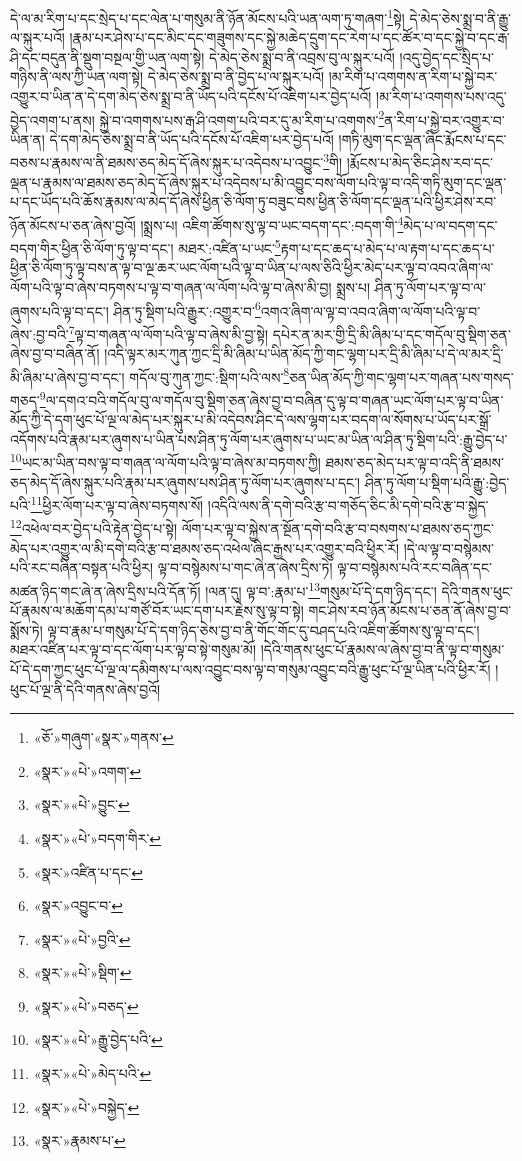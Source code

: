 དེ་ལ་མ་རིག་པ་དང་སྲེད་པ་དང་ལེན་པ་གསུམ་ནི་ཉོན་མོངས་པའི་ཡན་ལག་ཏུ་གཞག་\footnote{«ཅོ་»གཞུག་«སྣར་»གནས་}སྟེ། དེ་མེད་ཅེས་སྨྲ་བ་ནི་རྒྱུ་ལ་སྐུར་པའོ། །རྣམ་པར་ཤེས་པ་དང་མིང་དང་གཟུགས་དང་སྐྱེ་མཆེད་དྲུག་དང་རེག་པ་དང་ཚོར་བ་དང་སྐྱེ་བ་དང་རྒ་ཤི་དང་བདུན་ནི་སྡུག་བསྔལ་གྱི་ཡན་ལག་སྟེ། དེ་མེད་ཅེས་སྨྲ་བ་ནི་འབྲས་བུ་ལ་སྐུར་པའོ། །འདུ་བྱེད་དང་སྲིད་པ་གཉིས་ནི་ལས་ཀྱི་ཡན་ལག་སྟེ། དེ་མེད་ཅེས་སྨྲ་བ་ནི་བྱེད་པ་ལ་སྐུར་པའོ། །མ་རིག་པ་འགགས་ན་རིག་པ་སྐྱེ་བར་འགྱུར་བ་ཡིན་ན་དེ་དག་མེད་ཅེས་སྨྲ་བ་ནི་ཡོད་པའི་དངོས་པོ་འཇིག་པར་བྱེད་པའོ། །མ་རིག་པ་འགགས་པས་འདུ་བྱེད་འགག་པ་ནས། སྐྱེ་བ་འགགས་པས་རྒ་ཤི་འགག་པའི་བར་དུ་མ་རིག་པ་འགགས་\footnote{«སྣར་»«པེ་»འགག་}ན་རིག་པ་སྐྱེ་བར་འགྱུར་བ་ཡིན་ན། དེ་དག་མེད་ཅེས་སྨྲ་བ་ནི་ཡོད་པའི་དངོས་པོ་འཇིག་པར་བྱེད་པའོ། །གཏི་མུག་དང་ལྡན་ཞིང་རྨོངས་པ་དང་བཅས་པ་རྣམས་ལ་ནི་ཐམས་ཅད་མེད་དོ་ཞེས་སྐུར་པ་འདེབས་པ་འབྱུང་\footnote{«སྣར་»«པེ་»བྱུང་}གི། །རྨོངས་པ་མེད་ཅིང་ཤེས་རབ་དང་ལྡན་པ་རྣམས་ལ་ཐམས་ཅད་མེད་དོ་ཞེས་སྐུར་པ་འདེབས་པ་མི་འབྱུང་བས་ལོག་པའི་ལྟ་བ་འདི་གཏི་མུག་དང་ལྡན་པ་དང་ཡོད་པའི་ཆོས་རྣམས་ལ་མེད་དོ་ཞེས་ཕྱིན་ཅི་ལོག་ཏུ་བཟུང་བས་ཕྱིན་ཅི་ལོག་དང་ལྡན་པའི་ཕྱིར་ཤེས་རབ་ཉོན་མོངས་པ་ཅན་ཞེས་བྱའོ། །སྨྲས་པ། འཇིག་ཚོགས་སུ་ལྟ་བ་ཡང་བདག་དང་:བདག་གི་\footnote{«སྣར་»«པེ་»བདག་གིར་}མེད་པ་ལ་བདག་དང་བདག་གིར་ཕྱིན་ཅི་ལོག་ཏུ་ལྟ་བ་དང་། མཐར་:འཛིན་པ་ཡང་\footnote{«སྣར་»འཛིན་པ་དང་}རྟག་པ་དང་ཆད་པ་མེད་པ་ལ་རྟག་པ་དང་ཆད་པ་ཕྱིན་ཅི་ལོག་ཏུ་ལྟ་བས་ན་ལྟ་བ་ལྔ་ཆར་ཡང་ལོག་པའི་ལྟ་བ་ཡིན་པ་ལས་ཅིའི་ཕྱིར་མེད་པར་ལྟ་བ་འབའ་ཞིག་ལ་ལོག་པའི་ལྟ་བ་ཞེས་བཏགས་པ་ལྟ་བ་གཞན་ལ་ལོག་པའི་ལྟ་བ་ཞེས་མི་བྱ། སྨྲས་པ། ཤིན་ཏུ་ལོག་པར་ལྟ་བ་ལ་ཞུགས་པའི་ལྟ་བ་དང་། ཤིན་ཏུ་སྡིག་པའི་རྒྱུར་:འགྱུར་བ་\footnote{«སྣར་»འབྱུང་བ་}འགའ་ཞིག་ལ་ལྟ་བ་འབའ་ཞིག་ལ་ལོག་པའི་ལྟ་བ་ཞེས་:བྱ་བའི་\footnote{«སྣར་»«པེ་»བྱའི་}ལྟ་བ་གཞན་ལ་ལོག་པའི་ལྟ་བ་ཞེས་མི་བྱ་སྟེ། དཔེར་ན་མར་གྱི་དྲི་མི་ཞིམ་པ་དང་གདོལ་བུ་སྡིག་ཅན་ཞེས་བྱ་བ་བཞིན་ནོ། །འདི་ལྟར་མར་ཀུན་ཀྱང་དྲི་མི་ཞིམ་པ་ཡིན་མོད་ཀྱི་གང་ལྷག་པར་དྲི་མི་ཞིམ་པ་དེ་ལ་མར་དྲི་མི་ཞིམ་པ་ཞེས་བྱ་བ་དང་། གདོལ་བུ་ཀུན་ཀྱང་:སྡིག་པའི་ལས་\footnote{«སྣར་»«པེ་»སྡིག་}ཅན་ཡིན་མོད་ཀྱི་གང་ལྷག་པར་གཞན་པས་གསད་གཅད་\footnote{«སྣར་»«པེ་»བཅད་}ལ་དགའ་བའི་གདོལ་བུ་ལ་གདོལ་བུ་སྡིག་ཅན་ཞེས་བྱ་བ་བཞིན་དུ་ལྟ་བ་གཞན་ཡང་ལོག་པར་ལྟ་བ་ཡིན་མོད་ཀྱི་དེ་དག་ཕུང་པོ་ལྔ་ལ་མེད་པར་སྐུར་པ་མི་འདེབས་ཤིང་དེ་ལས་ལྷག་པར་བདག་ལ་སོགས་པ་ཡོད་པར་སྒྲོ་འདོགས་པའི་རྣམ་པར་ཞུགས་པ་ཡིན་པས་ཤིན་ཏུ་ལོག་པར་ཞུགས་པ་ཡང་མ་ཡིན་ལ་ཤིན་ཏུ་སྡིག་པའི་:རྒྱུ་བྱེད་པ་\footnote{«སྣར་»«པེ་»རྒྱུ་བྱེད་པའི་}ཡང་མ་ཡིན་བས་ལྟ་བ་གཞན་ལ་ལོག་པའི་ལྟ་བ་ཞེས་མ་བཏགས་ཀྱི། ཐམས་ཅད་མེད་པར་ལྟ་བ་འདི་ནི་ཐམས་ཅད་མེད་དོ་ཞེས་སྐུར་པའི་རྣམ་པར་ཞུགས་པས་ཤིན་ཏུ་ལོག་པར་ཞུགས་པ་དང་། ཤིན་ཏུ་ལོག་པ་སྡིག་པའི་རྒྱུ་:བྱེད་པའི་\footnote{«སྣར་»«པེ་»མེད་པའི་}ཕྱིར་ལོག་པར་ལྟ་བ་ཞེས་བཏགས་སོ། །འདིའི་ལས་ནི་དགེ་བའི་རྩ་བ་གཅོད་ཅིང་མི་དགེ་བའི་རྩ་བ་སྐྱེད་\footnote{«སྣར་»«པེ་»བསྐྱེད་}འཕེལ་བར་བྱེད་པའི་རྟེན་བྱེད་པ་སྟེ། ལོག་པར་ལྟ་བ་སྐྱེས་ན་སྔོན་དགེ་བའི་རྩ་བ་བསགས་པ་ཐམས་ཅད་ཀྱང་མེད་པར་འགྱུར་ལ་མི་དགེ་བའི་རྩ་བ་ཐམས་ཅད་འཕེལ་ཞིང་རྒྱས་པར་འགྱུར་བའི་ཕྱིར་རོ། །དེ་ལ་ལྟ་བ་བསྙེམས་པའི་རང་བཞིན་བསྟན་པའི་ཕྱིར། ལྟ་བ་བསྙེམས་པ་གང་ཞེ་ན་ཞེས་དྲིས་ཏེ། ལྟ་བ་བསྙེམས་པའི་རང་བཞིན་དང་མཚན་ཉིད་གང་ཞེ་ན་ཞེས་དྲིས་པའི་དོན་ཏོ། །ལན་དུ། ལྟ་བ་:རྣམ་པ་\footnote{«སྣར་»རྣམས་པ་}གསུམ་པོ་དེ་དག་ཉིད་དང་། དེའི་གནས་ཕུང་པོ་རྣམས་ལ་མཆོག་དམ་པ་གཙོ་བོར་ཡང་དག་པར་རྗེས་སུ་ལྟ་བ་སྟེ། གང་ཤེས་རབ་ཉོན་མོངས་པ་ཅན་ནོ་ཞེས་བྱ་བ་སྨོས་ཏེ། ལྟ་བ་རྣམ་པ་གསུམ་པོ་དེ་དག་ཉིད་ཅེས་བྱ་བ་ནི་གོང་གོང་དུ་བཤད་པའི་འཇིག་ཚོགས་སུ་ལྟ་བ་དང་། མཐར་འཛིན་པར་ལྟ་བ་དང་ལོག་པར་ལྟ་བ་སྟེ་གསུམ་མོ། །དེའི་གནས་ཕུང་པོ་རྣམས་ལ་ཞེས་བྱ་བ་ནི་ལྟ་བ་གསུམ་པོ་དེ་དག་ཀྱང་ཕུང་པོ་ལྔ་ལ་དམིགས་པ་ལས་འབྱུང་བས་ལྟ་བ་གསུམ་འབྱུང་བའི་རྒྱུ་ཕུང་པོ་ལྔ་ཡིན་པའི་ཕྱིར་རོ། །ཕུང་པོ་ལྔ་ནི་དེའི་གནས་ཞེས་བྱའོ། 